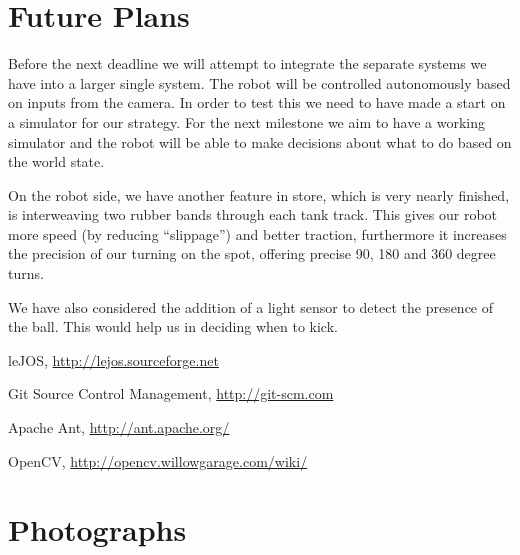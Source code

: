 \documentclass[12pt, a4paper, titlepage]{article}
\begin{document}
\section{Future Plans}

Before the next deadline we will attempt to integrate the separate systems we
have into a larger single system. The robot will be controlled autonomously
based on inputs from the camera. In order to test this we need to have made a
start on a simulator for our strategy. For the next milestone we aim to have a
working simulator and the robot will be able to make decisions about what to do
based on the world state.

On the robot side, we have another feature in store, which is very nearly
finished, is interweaving two rubber bands through each tank track. This
gives our robot more speed (by reducing ``slippage'') and better traction,
furthermore it increases the precision of our turning on the spot, offering
precise 90, 180 and 360 degree turns.

We have also considered the addition of a light sensor to detect the presence of
the ball. This would help us in deciding when to kick.

\newpage

\setcounter{section}{5}
\begin{thebibliography}{9}

	leJOS,
	\url{http://lejos.sourceforge.net}

	Git Source Control Management,
	\url{http://git-scm.com}

	Apache Ant,
	\url{http://ant.apache.org/}

	OpenCV,
	\url{http://opencv.willowgarage.com/wiki/}

\end{thebibliography}

\appendix
\section{Photographs}
\end{document}

